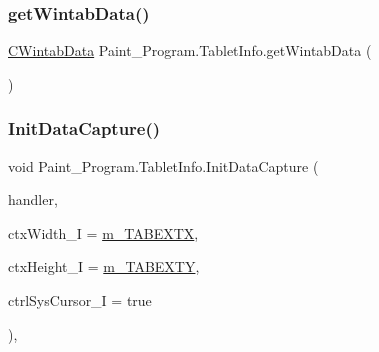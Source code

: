 \mbox{\label{class_paint___program_1_1_tablet_info_ab9818599347fcfbc04c65e173ffe53a3}} 
\subsubsection{\texorpdfstring{get\+Wintab\+Data()}{getWintabData()}}
{\footnotesize\ttfamily \mbox{\hyperlink{class_wintab_d_n_1_1_c_wintab_data}{C\+Wintab\+Data}} Paint\+\_\+\+Program.\+Tablet\+Info.\+get\+Wintab\+Data (\begin{DoxyParamCaption}{ }\end{DoxyParamCaption})\hspace{0.3cm}{\ttfamily [inline]}}

\mbox{\label{class_paint___program_1_1_tablet_info_ae3eaec5febf23138a724e6b5d94d2e9a}} 
\subsubsection{\texorpdfstring{Init\+Data\+Capture()}{InitDataCapture()}}
{\footnotesize\ttfamily void Paint\+\_\+\+Program.\+Tablet\+Info.\+Init\+Data\+Capture (\begin{DoxyParamCaption}\item[{Event\+Handler$<$ \mbox{\hyperlink{class_wintab_d_n_1_1_message_received_event_args}{Message\+Received\+Event\+Args}} $>$}]{handler,  }\item[{int}]{ctx\+Width\+\_\+I = {\ttfamily \mbox{\hyperlink{class_paint___program_1_1_tablet_info_aec96087301274b16e37ad97d9d86f2a8}{m\+\_\+\+T\+A\+B\+E\+X\+TX}}},  }\item[{int}]{ctx\+Height\+\_\+I = {\ttfamily \mbox{\hyperlink{class_paint___program_1_1_tablet_info_a694255f1b42334dcd3c05f6ff9b0ff6d}{m\+\_\+\+T\+A\+B\+E\+X\+TY}}},  }\item[{bool}]{ctrl\+Sys\+Cursor\+\_\+I = {\ttfamily true} }\end{DoxyParamCaption})\hspace{0.3cm}{\ttfamily [inline]}, {\ttfamily [private]}}

